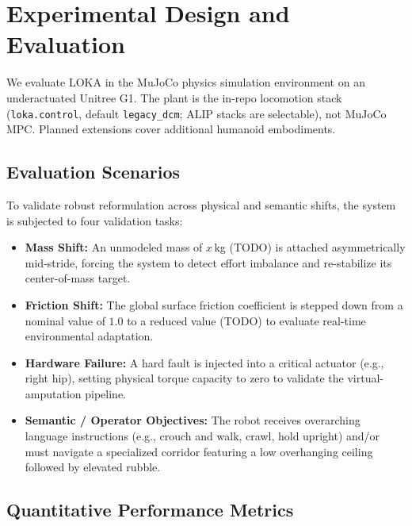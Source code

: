 \section{Experimental Design and Evaluation}
\label{sec:experiments}

We evaluate LOKA in the MuJoCo physics simulation environment on an underactuated Unitree G1. The plant is the in-repo locomotion stack (\texttt{loka.control}, default \texttt{legacy\_dcm}; ALIP stacks are selectable), not MuJoCo MPC. Planned extensions cover additional humanoid embodiments.

\subsection{Evaluation Scenarios}
\label{sec:scenarios}

To validate robust reformulation across physical and semantic shifts, the system is subjected to four validation tasks:
\begin{itemize}
\item \textbf{Mass Shift:} An unmodeled mass of \(x\)\,kg (TODO) is attached asymmetrically mid-stride, forcing the system to detect effort imbalance and re-stabilize its center-of-mass target.
\item \textbf{Friction Shift:} The global surface friction coefficient is stepped down from a nominal value of $1.0$ to a reduced value (TODO) to evaluate real-time environmental adaptation.
\item \textbf{Hardware Failure:} A hard fault is injected into a critical actuator (e.g., right hip), setting physical torque capacity to zero to validate the virtual-amputation pipeline.
\item \textbf{Semantic / Operator Objectives:} The robot receives overarching language instructions (e.g., crouch and walk, crawl, hold upright) and/or must navigate a specialized corridor featuring a low overhanging ceiling followed by elevated rubble.
\end{itemize}

\subsection{Quantitative Performance Metrics}
\label{sec:metrics}

